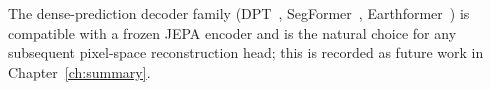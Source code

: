 The dense-prediction decoder family
(DPT~\cite{ranftl2021dpt}, SegFormer~\cite{xie2021segformer},
Earthformer~\cite{earthformer2022}) is compatible with a frozen
JEPA encoder and is the natural choice for any subsequent
pixel-space reconstruction head; this is recorded as future work
in Chapter~\ref{ch:summary}.
